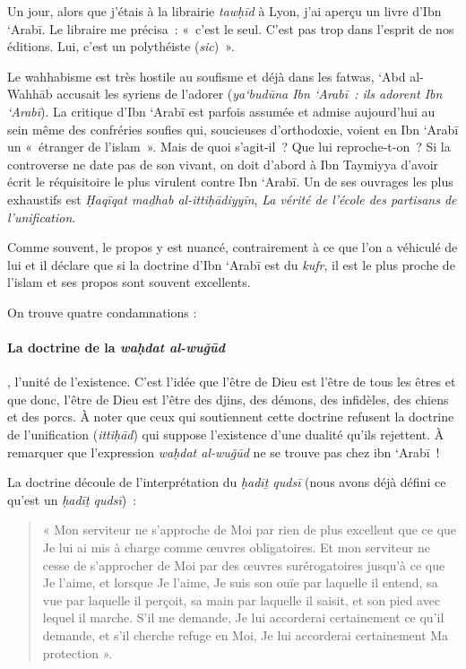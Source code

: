 Un jour, alors que j'étais à la librairie \emph{tawḥīd} à Lyon, j'ai
aperçu un livre d'Ibn `Arabī. Le libraire me précisa~: «~c'est le seul.
C'est pas trop dans l'esprit de nos éditions. Lui, c'est un polythéiste
(\emph{sic})~».

Le wahhabisme est très hostile au soufisme et déjà dans les fatwas, `Abd
al-Wahhāb accusait les syriens de l'adorer (\emph{ya`budūna Ibn `Arabī~:
ils adorent Ibn `Arabī}). La critique d'Ibn `Arabī est parfois assumée et
admise aujourd'hui au sein même des confréries soufies qui, soucieuses
d'orthodoxie, voient en Ibn `Arabī un «~étranger de l'islam~». Mais de
quoi s'agit-il~? Que lui reproche-t-on~? Si la controverse ne date pas
de son vivant, on doit d'abord à Ibn Taymiyya d'avoir écrit le
réquisitoire le plus virulent contre Ibn `Arabī. Un de ses ouvrages les
plus exhaustifs est \emph{Ḥaqīqat maḏhab al-ittiḥādiyyīn}, \emph{La
vérité de l'école des partisans de l'unification}.

Comme souvent, le propos y est nuancé, contrairement à ce que l'on a
véhiculé de lui et il déclare que si la doctrine d'Ibn `Arabī est du
\emph{kufr}, il est le plus proche de l'islam et ses propos sont souvent
excellents.

On trouve quatre condamnations :


  \paragraph{La doctrine de la \emph{waḥdat al-wuǧūd}}, l'unité de
  l'existence. C'est l'idée que l'être de Dieu est l'être de tous les
  êtres et que donc, l'être de Dieu est l'être des djins, des démons,
  des infidèles, des chiens et des porcs. À noter que ceux qui
  soutiennent cette doctrine refusent la doctrine de l'unification
  (\emph{ittiḥād}) qui suppose l'existence d'une dualité qu'ils
  rejettent. À remarquer que l'expression \emph{waḥdat al-wuǧūd} ne se
  trouve pas chez ibn `Arabī~!

La doctrine découle de l'interprétation du \emph{ḥadīṯ qudsī} (nous
avons déjà défini ce qu'est un \emph{ḥadīṯ qudsī})~:
\begin{quote}


« Mon serviteur ne s'approche de Moi par rien de plus excellent que ce
que Je lui ai mis à charge comme œuvres obligatoires. Et mon serviteur
ne cesse de s'approcher de Moi par des œuvres surérogatoires jusqu'à ce
que Je l'aime, et lorsque Je l'aime, Je suis son ouïe par laquelle il
entend, sa vue par laquelle il perçoit, sa main par laquelle il saisit,
et son pied avec lequel il marche. S'il me demande, Je lui accorderai
certainement ce qu'il demande, et s'il cherche refuge en Moi, Je lui
accorderai certainement Ma protection ».
\end{quote}

